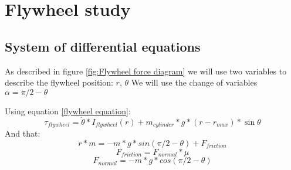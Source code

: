 \section{Flywheel study}

\subsection{System of differential equations}
As described in figure \ref{fig:Flywheel force diagram} we will use two variables to describe the flywheel position: $r$, $\theta$ 
We will use the change of variables $\alpha =\pi/2 - \theta$

Using equation \ref{flywheel equation}:
\[\tau_{flywheel} = \ddot{\theta}*I_{flywheel}(r) + m_{cylinder} * g * (r - r_{max}) * \sin{\theta}\]
And that:
\[\ddot{r} * m = -m * g * sin(\pi/2-\theta) + F_{friction}\]
\[F_{friction} = F_{normal} * \mu\]
\[F_{normal} = -m * g * cos(\pi/2-\theta)\]